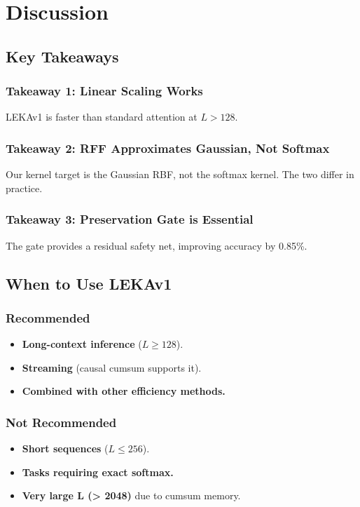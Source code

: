 \section{Discussion}

\subsection{Key Takeaways}

\subsubsection{Takeaway 1: Linear Scaling Works}

LEKAv1 is faster than standard attention at $L > 128$.

\subsubsection{Takeaway 2: RFF Approximates Gaussian, Not Softmax}

Our kernel target is the Gaussian RBF, not the softmax kernel. The two 
differ in practice.

\subsubsection{Takeaway 3: Preservation Gate is Essential}

The gate provides a residual safety net, improving accuracy by 
0.85\%.

\subsection{When to Use LEKAv1}

\subsubsection{Recommended}
\begin{itemize}
\item \textbf{Long-context inference} ($L \geq 128$).
\item \textbf{Streaming} (causal cumsum supports it).
\item \textbf{Combined with other efficiency methods.}

\end{itemize}
\subsubsection{Not Recommended}
\begin{itemize}
\item \textbf{Short sequences} ($L \leq 256$).
\item \textbf{Tasks requiring exact softmax.}
\item \textbf{Very large L (\textgreater{} 2048)} due to cumsum memory.

\end{itemize}
